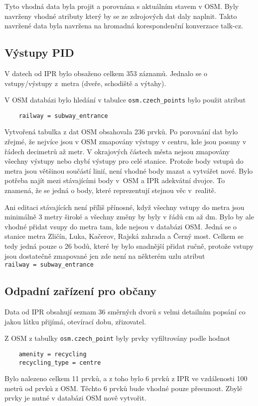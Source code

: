 Tyto vhodná data byla projit a porovnána s aktuálním stavem v OSM.
Byly navrženy vhodné atributy který by se ze zdrojových dat daly naplnit.
Takto navržené data byla navržena na hromadná korespondenční konverzace talk-cz.


\subsection{Výstupy PID}
\label{Výstupy PID}
V datech od IPR bylo obsaženo celkem 353 záznamů. Jednalo se o vstupy/výstupy
z~metra (dveře, schodiště a výtahy).

V OSM databázi bylo hledání v tabulce {\tt osm.czech\_points} bylo použit
atribut
\begin{verbatim}
    railway = subway_entrance
\end{verbatim}
Vytvořená tabulka z dat OSM obsahovala 236 prvků.
Po porovnání dat bylo zřejmé, že nejvíce jsou v OSM zmapovány
výstupy v centru, kde jsou posuny v řádech decimetrů až metr. V okrajových
částech města nejsou zmapovány všechny výstupy nebo chybí výstupy pro celé
stanice. Protože body vstupů do metra jsou většinou součástí linií,
není vhodné body mazat a vytvářet nové. Bylo potřeba najít mezi stávajícími body
v~OSM a IPR adekvátní dvojce. To znamená, že se jedná o body, které reprezentují 
stejnou věc v~realitě.

Ani editaci stávajících není příliš přínosné, když všechny vstupy do metra jsou
minimálně 3 metry široké a všechny změny by byly v řádů cm až dm. 
Bylo by ale vhodné přidat vsupy do metra tam, kde nejsou v databázi OSM.
Jedná se o stanice metra Zličín, Luka, Kačerov, Rajská zahrada a Černý most. 
Celkem se tedy jedná pouze o 26 bodů, které by bylo snadnější přidat ručně, 
protože vstupy jsou dostatečně zmapované jen zde není na některém uzlu atribut {\tt railway~=~subway\_entrance}


\subsection{Odpadní zařízení pro občany}
\label{Odpadní zařízení pro občany}
Data od IPR obsahují seznam 36 směrných dvorů s velmi detailním popsání co 
jakou látku přijímá, otevírací dobu, zřizovatel. 

Z OSM z tabulky {\tt osm.czech\_point} byly prvky vyfiltrovány podle hodnot 
\begin{verbatim}
    amenity = recycling
    recycling_type = centre
\end{verbatim}    
Bylo nalezeno celkem 11 prvků, a z toho bylo 6 prvků z IPR ve vzdálenosti 
100 metrů od prvků z OSM. Těchto 6 prvků bude vhodné pouze přesunout. Zbylé 
prvky je nutné v databázi OSM nově vytvořit.

